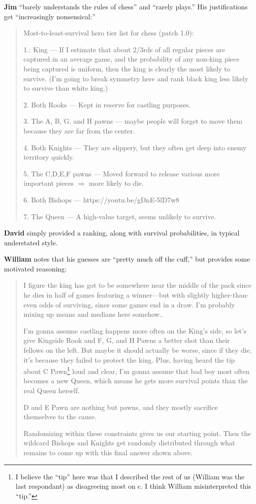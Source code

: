 \documentclass[twocolumn]{article}
\begin{document}
{\bf Jim} ``barely understands the rules of chess'' and ``rarely plays.'' His justifications get ``increasingly nonsensical:''

\begin{quote}
Most-to-least-survival hero tier list for chess (patch 1.0):

1.: King --- If I estimate that about 2/3rds of all regular pieces are
captured in an average game, and the probability of any non-king piece
being captured is uniform, then the king is clearly the most likely to
survive. (I'm going to break symmetry here and rank black king less
likely to survive than white king.)

2. Both Rooks --- Kept in reserve for castling purposes.

3. The A, B, G, and H pawns --- maybe people will forget to move them because they are far from the center.

4. Both Knights --- They are slippery, but they often get deep into enemy territory quickly.

5. The C,D,E,F pawns --- Moved forward to release various more important pieces $\Rightarrow$ more likely to die.

6. Both Bishops --- https://youtu.be/gDnE-5lD7w8

7. The Queen --- A high-value target, seems unlikely to survive.
\end{quote}

{\bf David} simply provided a ranking, along with survival
probabilities, in typical understated style.

\medskip
{\bf William} notes that his guesses are
``pretty much off the cuff,'' but provides some motivated reasoning:

\begin{quote}
I figure the king has got to be somewhere near the middle of the pack
since he dies in half of games featuring a winner---but with slightly
higher-than-even odds of surviving, since some games end in a draw.
I'm probably mixing up means and medians here somehow..

I'm gonna assume castling happens more often on the King's side, so
let's give Kingside Rook and F, G, and H Pawns a better shot than
their fellows on the left. But maybe it should actually be worse,
since if they die, it's because they failed to protect the king. Plus,
having heard the tip about C Pawn\footnote{I believe the ``tip'' here
  was that I described the rest of us (William was the last
  respondant) as disagreeing most on \pawn c. I think William
  misinterpreted this ``tip.''} loud and clear, I'm gonna assume that
bad boy most often becomes a new Queen, which means he gets more
survival points than the real Queen herself.

D and E Pawn are nothing but pawns, and they mostly sacrifice
themselves to the cause.

Randomizing within these constraints gives us our starting point. Then
the wildcard Bishops and Knights get randomly distributed through what
remains to come up with this final answer shown above.
\end{quote}
\end{document}
